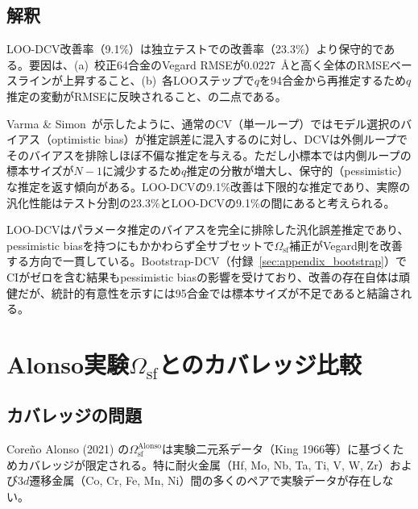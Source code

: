 \documentclass[5p,10pt]{elsarticle}
\begin{document}
\subsection{解釈}

LOO-DCV改善率（9.1\%）は独立テストでの改善率（23.3\%）より保守的である。要因は、(a)~校正64合金のVegard RMSEが0.0227~\AA{}と高く全体のRMSEベースラインが上昇すること、(b)~各LOOステップで$q$を94合金から再推定するため$q$推定の変動がRMSEに反映されること、の二点である。

Varma \& Simon~\cite{Varma2006}が示したように、通常のCV（単一ループ）ではモデル選択のバイアス（optimistic bias）が推定誤差に混入するのに対し、DCVは外側ループでそのバイアスを排除しほぼ不偏な推定を与える。ただし小標本では内側ループの標本サイズが$N-1$に減少するため$q$推定の分散が増大し、保守的（pessimistic）な推定を返す傾向がある。LOO-DCVの9.1\%改善は下限的な推定であり、実際の汎化性能はテスト分割の23.3\%とLOO-DCVの9.1\%の間にあると考えられる。

LOO-DCVはパラメータ推定のバイアスを完全に排除した汎化誤差推定であり、pessimistic biasを持つにもかかわらず全サブセットで$\Omega_\text{sf}$補正がVegard則を改善する方向で一貫している。Bootstrap-DCV（付録~\ref{sec:appendix_bootstrap}）でCIがゼロを含む結果もpessimistic biasの影響を受けており、改善の存在自体は頑健だが、統計的有意性を示すには95合金では標本サイズが不足であると結論される。


\section{Alonso実験$\Omega_\text{sf}$とのカバレッジ比較}
\label{sec:appendix_alonso}

\subsection{カバレッジの問題}

Coreño Alonso (2021) の$\Omega_\text{sf}^\text{Alonso}$は実験二元系データ（King 1966等）に基づくためカバレッジが限定される。特に耐火金属（Hf, Mo, Nb, Ta, Ti, V, W, Zr）および3$d$遷移金属（Co, Cr, Fe, Mn, Ni）間の多くのペアで実験データが存在しない。
\end{document}
